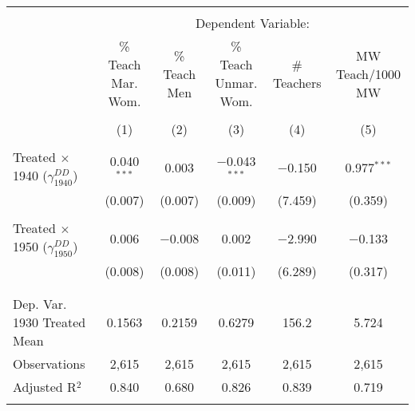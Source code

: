 
\begin{tabular}{@{\extracolsep{5pt}}lccccc} 
\\[-1.8ex]\hline 
\hline \\[-1.8ex] 
 & \multicolumn{5}{c}{Dependent Variable:} \\ 
\cline{2-6} 
 & \% Teach Mar. Wom. & \% Teach Men & \% Teach Unmar. Wom. & \# Teachers & MW Teach/1000 MW \\ 
\\[-1.8ex] & (1) & (2) & (3) & (4) & (5)\\ 
\hline \\[-1.8ex] 
 Treated $\times$ 1940 ($\gamma_{1940}^{DD}$) & 0.040$^{***}$ & 0.003 & $-$0.043$^{***}$ & $-$0.150 & 0.977$^{***}$ \\ 
  & (0.007) & (0.007) & (0.009) & (7.459) & (0.359) \\ 
  & & & & & \\ 
 Treated $\times$ 1950 ($\gamma_{1950}^{DD}$) & 0.006 & $-$0.008 & 0.002 & $-$2.990 & $-$0.133 \\ 
  & (0.008) & (0.008) & (0.011) & (6.289) & (0.317) \\ 
  & & & & & \\ 
\hline \\[-1.8ex] 
Dep. Var. 1930 Treated Mean & 0.1563 & 0.2159 & 0.6279 & 156.2 & 5.724 \\ 
Observations & 2,615 & 2,615 & 2,615 & 2,615 & 2,615 \\ 
Adjusted R$^{2}$ & 0.840 & 0.680 & 0.826 & 0.839 & 0.719 \\ 
\hline 
\hline \\[-1.8ex] 
\end{tabular} 
